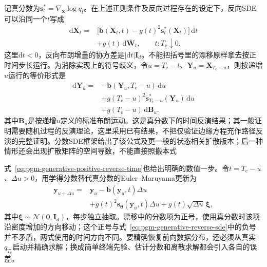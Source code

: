 记真分数为$\bm{s}_t^*=\nabla_{\bm{x}}\log q_t$。在上述正则条件及反向过程存在的设定下，反向SDE可以沿同一个$t$写成
\begin{equation}
  \label{eq:pgm-generative-reverse-sde}
  \begin{aligned}
    \mathrm{d}\bm{X}_t
    ={}&\bigl[\bm{b}(\bm{X}_t,t)-g(t)^2\bm{s}_t^*(\bm{X}_t)\bigr]
         \,\mathrm{d}t\\
       &+g(t)\,\mathrm{d}\overline{\bm{W}}_t,
    \qquad t:T_{\mathrm{c}}\downarrow0.
  \end{aligned}
\end{equation}
这里$\mathrm{d}t<0$，反向布朗增量的协方差是$|\mathrm{d}t|\bm{I}_d$。不能把括号里的漂移原样拿去按正时间步长运行。为消除实现上的符号歧义，令$u=T_{\mathrm{c}}-t$、$\bm{Y}_u=\bm{X}_{T_{\mathrm{c}}-u}$，则按递增$u$运行的等价形式是
\begin{equation}
  \label{eq:pgm-generative-positive-reverse-time}
  \begin{aligned}
    \mathrm{d}\bm{Y}_u
      ={}&-\bm{b}(\bm{Y}_u,T_{\mathrm{c}}-u)\,\mathrm{d}u\\
         &+g(T_{\mathrm{c}}-u)^2
              \bm{s}_{T_{\mathrm{c}}-u}^*(\bm{Y}_u)\,\mathrm{d}u\\
         &+g(T_{\mathrm{c}}-u)\,\mathrm{d}\bm{B}_u.
  \end{aligned}
\end{equation}
其中$\bm{B}_u$是按递增$u$定义的标准布朗运动。这是真分数下的时间反演结果；其一般证明需要随机过程的反演理论，这里采用已有结果，不把仅验证边缘方程充作路径反演的完整证明。分数SDE框架给出了该公式及更一般的状态相关扩散版本；后一种情形还会出现扩散矩阵的空间导数，不能直接照搬本式

式~\eqref{eq:pgm-generative-positive-reverse-time}也给出明确的数值一步。令$t=T_{\mathrm{c}}-u$、$\Delta u>0$，用学得分数替代真分数的Euler--Maruyama更新为
\[
  \begin{aligned}
    \bm{y}_{u+\Delta u}
      ={}&\bm{y}_u-\bm{b}(\bm{y}_u,t)\Delta u\\
         &+g(t)^2\bm{s}_{\bm{\theta}}(\bm{y}_u,t)\Delta u
          +g(t)\sqrt{\Delta u}\,\bm{\xi},
  \end{aligned}
\]
其中$\bm{\xi}\sim\mathcal{N}(\bm{0},\bm{I}_d)$，每步独立抽取。漂移中的分数项为正号，使用真分数时该项沿密度增加的方向移动；这个正号与式~\eqref{eq:pgm-generative-reverse-sde}中的负号并不矛盾，两式使用的时间方向不同。要精确恢复前向数据分布，还必须从真实$q_{T_{\mathrm{c}}}$启动并精确求解；换成简单终端先验、估计分数和离散求解都会引入各自的误差。

